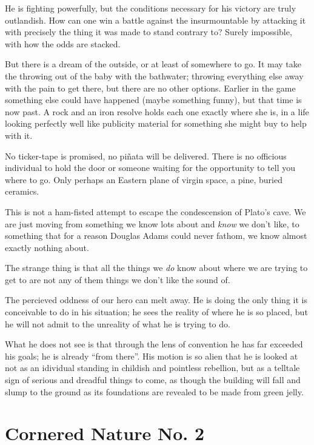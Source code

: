 \documentclass{book}
\begin{document}
He is fighting powerfully, but the conditions necessary for his victory are
truly outlandish. How can one win a battle against the insurmountable by
attacking it with precisely the thing it was made to stand contrary to? Surely
impossible, with how the odds are stacked.

But there is a dream of the outside, or at least of somewhere to go. It may
take the throwing out of the baby with the bathwater; throwing everything else
away with the pain to get there, but there are no other options. Earlier in the
game something else could have happened (maybe something funny), but that time
is now past. A rock and an iron resolve holds each one exactly where she is, in
a life looking perfectly well like publicity material for something she might
buy to help with it.

No ticker-tape is promised, no piñata will be delivered. There is no officious
individual to hold the door or someone waiting for the opportunity to tell you
where to go. Only perhaps an Eastern plane of virgin space, a pine, buried
ceramics.

This is not a ham-fisted attempt to escape the condescension of Plato's cave.
We are just moving from something we know lots about and \emph{know} we don't
like, to something that for a reason Douglas Adams could never fathom, we know
almost exactly nothing about.

The strange thing is that all the things we \emph{do} know about where we are
trying to get to are not any of them things we don't like the sound of.

The percieved oddness of our hero can melt away. He is doing the only thing it
is conceivable to do in his situation; he sees the reality of where he is so
placed, but he will not admit to the unreality of what he is trying to do.

What he does not see is that through the lens of convention he has far exceeded
his goals; he is already ``from there''. His motion is so alien that he is
looked at not as an idividual standing in childish and pointless rebellion, but
as a telltale sign of serious and dreadful things to come, as though the
building will fall and slump to the ground as its foundations are revealed to
be made from green jelly.

\chapter{Cornered Nature No. 2}
\end{document}
